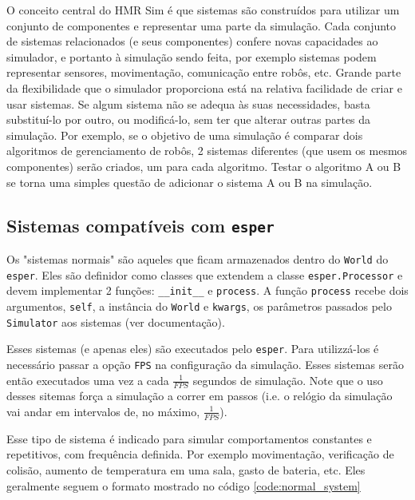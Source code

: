 O conceito central do HMR Sim é que sistemas são construídos para utilizar um conjunto de componentes e representar uma parte da simulação. Cada conjunto de sistemas relacionados (e seus componentes) confere novas capacidades ao simulador, e portanto à simulação sendo feita, por exemplo sistemas podem representar sensores, movimentação, comunicação entre robôs, etc. Grande parte da flexibilidade que o simulador proporciona está na relativa facilidade de criar e usar sistemas. Se algum sistema não se adequa às suas necessidades, basta substituí-lo por outro, ou modificá-lo, sem ter que alterar outras partes da simulação. Por exemplo, se o objetivo de uma simulação é comparar dois algoritmos de gerenciamento de robôs, 2 sistemas diferentes (que usem os mesmos componentes) serão criados, um para cada algoritmo. Testar o algoritmo A ou B se torna uma simples questão de adicionar o sistema A ou B na simulação.

\subsection{Sistemas compatíveis com \texttt{esper}}
\label{sec:normal_systems}

Os "sistemas normais" são aqueles que ficam armazenados dentro do \texttt{World} do \texttt{esper}. Eles são definidor como classes que extendem a classe \texttt{esper.Processor} e devem implementar 2 funções: \texttt{\_\_init\_\_} e \texttt{process}. A função \texttt{process} recebe dois argumentos, \texttt{self}, a instância do \texttt{World}  e \texttt{kwargs}, os parâmetros passados pelo \texttt{Simulator} aos sistemas (ver documentação).

Esses sistemas (e apenas eles) são executados pelo \texttt{esper}. Para utilizzá-los é necessário passar a opção \texttt{FPS} na configuração da simulação. Esses sistemas serão então executados uma vez a cada $\frac{1}{FPS}$ segundos de simulação. Note que o uso desses sitemas força a simulação a correr em passos (i.e. o relógio da simulação vai andar em intervalos de, no máximo, $\frac{1}{FPS}$).

Esse tipo de sistema é indicado para simular comportamentos constantes e repetitivos, com frequência definida. Por exemplo movimentação, verificação de colisão, aumento de temperatura em uma sala, gasto de bateria, etc. Eles geralmente seguem o formato mostrado no código \ref{code:normal_system}

\begin{adjustwidth}{-1cm}{0cm}

\end{adjustwidth}

